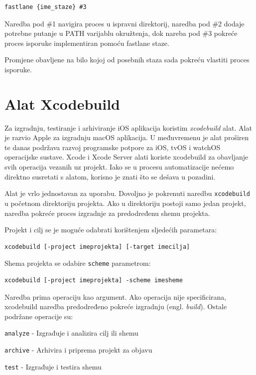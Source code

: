 \documentclass[times, utf8, diplomski, numeric]{fer}
\newcommand{\eng}[1]{(engl. \textit{#1})}
\begin{document}
\begin{appendices}
\begin{lstlisting}[caption=Sadržaj faze nakon obavljanja isporuke, label=listing:bot_fastlane_call]
fastlane {ime_staze} #3
\end{lstlisting}

Naredba pod \#1 navigira proces u ispravni direktorij, naredba pod \#2 dodaje potrebne putanje u PATH varijablu okružtenja, dok nareba pod \#3 pokreće proces isporuke implementiran pomoću fastlane staze.

Promjene obavljene na bilo kojoj od posebnih staza sada pokreću vlastiti proces isporuke.


\chapter{Alat Xcodebuild} \label{header:xcodebuild}

Za izgradnju, testiranje i arhiviranje iOS aplikacija koristim \textit{xcodebuild} alat. Alat je razvio Apple za izgradnju macOS aplikacija. U međuvremenu je alat proširen te danas podržava razvoj programske potpore za iOS, tvOS i watchOS operacijske sustave. Xcode i Xcode Server alati koriste xcodebuild za obavljanje svih operacija vezanih uz projekt. Iako se u procesu automatizacije nećemo direktno susretati s alatom, korisno je znati što se dešava u pozadini.

Alat je vrlo jednostavan za uporabu. Dovoljno je pokrenuti naredbu \verb|xcodebuild| u početnom direktoriju projekta. Ako u direktoriju postoji samo jedan projekt, naredba pokreće proces izgradnje za predodređenu shemu projekta.

Projekt i cilj se je moguće odabrati korištenjem sljedećih parametara:

\begin{verbatim}
xcodebuild [-project imeprojekta] [-target imecilja]
\end{verbatim}

Shema projekta se odabire \verb|scheme| parametrom:

\begin{verbatim}
xcodebuild [-project imeprojekta] -scheme imesheme
\end{verbatim}

Naredba prima operaciju kao argument. Ako operacija nije specificirana, xcodebuild naredba predodređeno pokreće izgradnju \eng{build}. Ostale podržane operacije su:

\verb|analyze| - Izgrađuje i analizira cilj ili shemu

\verb|archive| - Arhivira i priprema projekt za objavu

\verb|test| - Izgrađuje i testira shemu


\end{appendices}
\end{document}
